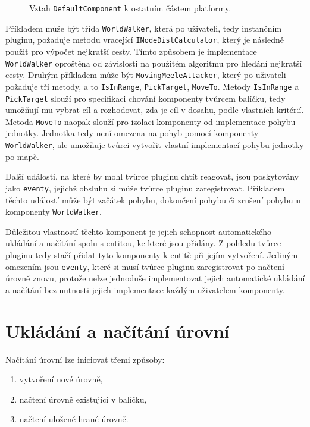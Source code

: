 \begin{figure}[h]
	\centering
	\fontsize{8pt}{11pt}\selectfont
	\def\svgwidth{\textwidth}
	
	\caption{Vztah \texttt{DefaultComponent} k ostatním částem platformy.}
	\label{fig:defaultcomponentstructure}
\end{figure}


Příkladem může být třída \texttt{WorldWalker}, která po uživateli, tedy instančním pluginu, požaduje metodu vracející \texttt{INodeDistCalculator}, který je následně použit pro výpočet nejkratší cesty. Tímto způsobem je implementace \texttt{WorldWalker} oproštěna od závislosti na použitém algoritmu pro hledání nejkratší cesty. Druhým příkladem může být \texttt{MovingMeeleAttacker}, který po uživateli požaduje tři metody, a to \texttt{IsInRange}, \texttt{PickTarget}, \texttt{MoveTo}. Metody \texttt{IsInRange} a \texttt{PickTarget} slouží pro specifikaci chování komponenty tvůrcem balíčku, tedy umožňují mu vybrat cíl a rozhodovat, zda je cíl v dosahu, podle vlastních kritérií. Metoda \texttt{MoveTo} naopak slouží pro izolaci komponenty od implementace pohybu jednotky. Jednotka tedy není omezena na pohyb pomocí komponenty \texttt{WorldWalker}, ale umožňuje tvůrci vytvořit vlastní implementací pohybu jednotky po mapě.

Další události, na které by mohl tvůrce pluginu chtít reagovat, jsou poskytovány jako \texttt{eventy}, jejichž obsluhu si může tvůrce pluginu zaregistrovat. Příkladem těchto událostí může být začátek pohybu, dokončení pohybu či zrušení pohybu u komponenty \texttt{WorldWalker}.

Důležitou vlastností těchto komponent je jejich schopnost automatického ukládání a načítání spolu s entitou, ke které jsou přidány. Z pohledu tvůrce pluginu tedy stačí přidat tyto komponenty k entitě při jejím vytvoření. Jediným omezením jsou \texttt{eventy}, které si musí tvůrce pluginu zaregistrovat po načtení úrovně znovu, protože nelze jednoduše implementovat jejich automatické ukládání a načítání bez nutnosti jejich implementace každým uživatelem komponenty. 

\section{Ukládání a načítání úrovní}
\label{sec:loading}

Načítání úrovní lze iniciovat třemi způsoby:
\begin{enumerate}
	\item vytvoření nové úrovně,
	\item načtení úrovně existující v balíčku,
	\item načtení uložené hrané úrovně.
\end{enumerate}

